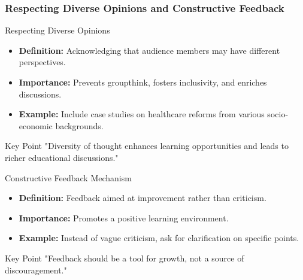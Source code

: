\documentclass[aspectratio=169]{beamer}
\begin{document}
\begin{frame}[fragile]
    \frametitle{Respecting Diverse Opinions and Constructive Feedback}
    \begin{block}{Respecting Diverse Opinions}
        \begin{itemize}
            \item \textbf{Definition:} Acknowledging that audience members may have different perspectives.
            \item \textbf{Importance:} Prevents groupthink, fosters inclusivity, and enriches discussions.
            \item \textbf{Example:} Include case studies on healthcare reforms from various socio-economic backgrounds.
        \end{itemize}
        
        \begin{block}{Key Point}
            "Diversity of thought enhances learning opportunities and leads to richer educational discussions."
        \end{block}
    \end{block}
    
    \begin{block}{Constructive Feedback Mechanism}
        \begin{itemize}
            \item \textbf{Definition:} Feedback aimed at improvement rather than criticism.
            \item \textbf{Importance:} Promotes a positive learning environment.
            \item \textbf{Example:} Instead of vague criticism, ask for clarification on specific points.
        \end{itemize}
        
        \begin{block}{Key Point}
            "Feedback should be a tool for growth, not a source of discouragement."
        \end{block}
    \end{block}
\end{frame}
\end{document}
